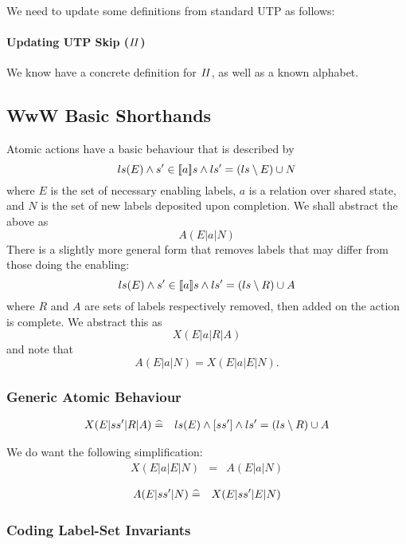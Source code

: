 We need to update some definitions from standard UTP as follows:

\paragraph{Updating UTP Skip ($\mathit{II}$)}\label{hd:updating-UTP-II}

We know have a concrete definition for $\mathit{II}$,
as well as a known alphabet.

\subsection{WwW Basic Shorthands}

Atomic actions have a basic behaviour that is described by
\[
ls(E) \land s' \in [\![{a}]\!] s \land ls' = (ls\setminus E) \cup N
\]
where $E$ is the set of necessary enabling labels,
$a$ is a relation over shared state,
and $N$ is the set of new labels deposited upon completion.
We shall abstract the above as
\[
A(E|a|N)
\]
There is a slightly more general form that removes labels
that may differ from those doing the enabling:
\[
ls(E) \land s' \in [\![{a}]\!] s \land ls' = (ls\setminus R) \cup A
\]
where $R$ and $A$ are sets of labels respectively removed, then added
on the action is complete.
We abstract this as
\[
  X(E|a|R|A)
\]
and note that
\[
  A(E|a|N) = X(E|a|E|N).
\]


\subsubsection{Generic Atomic Behaviour}

\begin{eqnarray*}
   X(E|ss'|R|A)
   &\mathrel{\widehat=}&
   ls(E) \land [ss'] \land ls'=(ls\setminus R)\cup A
\end{eqnarray*}

We do want the following simplification:
\begin{eqnarray*}
  X(E|a|E|N) &=& A(E|a|N)
\end{eqnarray*}

\begin{eqnarray*}
   A(E|ss'|N)
   &\mathrel{\widehat=}&
   X(E|ss'|E|N)
\end{eqnarray*}


\subsubsection{Coding Label-Set Invariants}

